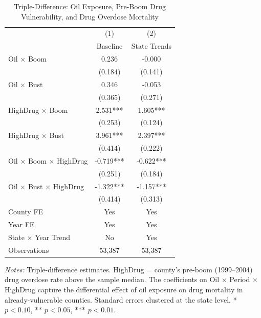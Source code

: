 \begin{table}[H]
\centering
\caption{Triple-Difference: Oil Exposure, Pre-Boom Drug Vulnerability, and Drug Overdose Mortality}
\begin{threeparttable}
\begin{tabular}{lcc}
\toprule
 & (1) & (2) \\
 & Baseline & State Trends \\
\midrule
Oil $\times$ Boom & 0.236 & -0.000 \\
 & (0.184) & (0.141) \\
Oil $\times$ Bust & 0.346 & -0.053 \\
 & (0.365) & (0.271) \\
HighDrug $\times$ Boom & 2.531*** & 1.605*** \\
 & (0.253) & (0.124) \\
HighDrug $\times$ Bust & 3.961*** & 2.397*** \\
 & (0.414) & (0.222) \\
\midrule
Oil $\times$ Boom $\times$ HighDrug & -0.719*** & -0.622*** \\
 & (0.251) & (0.184) \\
Oil $\times$ Bust $\times$ HighDrug & -1.322*** & -1.157*** \\
 & (0.414) & (0.313) \\
\midrule
County FE & Yes & Yes \\
Year FE & Yes & Yes \\
State $\times$ Year Trend & No & Yes \\
Observations & 53,387 & 53,387 \\
\bottomrule
\end{tabular}
\begin{tablenotes}[flushleft]
\small
\item \textit{Notes:} Triple-difference estimates. HighDrug = county's pre-boom (1999--2004) drug overdose rate above the sample median. The coefficients on Oil $\times$ Period $\times$ HighDrug capture the differential effect of oil exposure on drug mortality in already-vulnerable counties. Standard errors clustered at the state level. * $p<0.10$, ** $p<0.05$, *** $p<0.01$.
\end{tablenotes}
\end{threeparttable}
\label{tab:triple}
\end{table}

